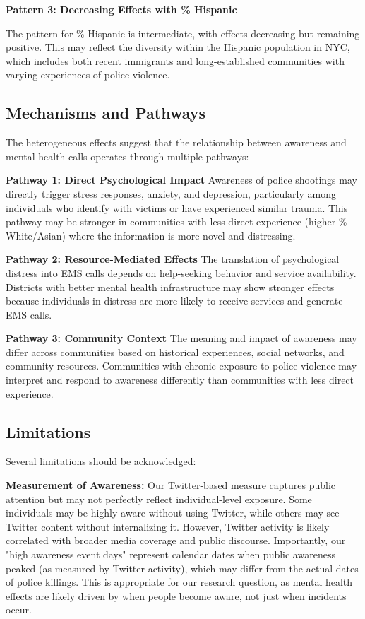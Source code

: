 \documentclass[11pt,a4paper]{article}
\begin{document}
\textbf{Pattern 3: Decreasing Effects with \% Hispanic}

The pattern for \% Hispanic is intermediate, with effects decreasing but remaining positive. This may reflect the diversity within the Hispanic population in NYC, which includes both recent immigrants and long-established communities with varying experiences of police violence.

\subsection{Mechanisms and Pathways}

The heterogeneous effects suggest that the relationship between awareness and mental health calls operates through multiple pathways:

\textbf{Pathway 1: Direct Psychological Impact}
Awareness of police shootings may directly trigger stress responses, anxiety, and depression, particularly among individuals who identify with victims or have experienced similar trauma. This pathway may be stronger in communities with less direct experience (higher \% White/Asian) where the information is more novel and distressing.

\textbf{Pathway 2: Resource-Mediated Effects}
The translation of psychological distress into EMS calls depends on help-seeking behavior and service availability. Districts with better mental health infrastructure may show stronger effects because individuals in distress are more likely to receive services and generate EMS calls.

\textbf{Pathway 3: Community Context}
The meaning and impact of awareness may differ across communities based on historical experiences, social networks, and community resources. Communities with chronic exposure to police violence may interpret and respond to awareness differently than communities with less direct experience.

\subsection{Limitations}

Several limitations should be acknowledged:

\textbf{Measurement of Awareness:} Our Twitter-based measure captures public attention but may not perfectly reflect individual-level exposure. Some individuals may be highly aware without using Twitter, while others may see Twitter content without internalizing it. However, Twitter activity is likely correlated with broader media coverage and public discourse. Importantly, our "high awareness event days" represent calendar dates when public awareness peaked (as measured by Twitter activity), which may differ from the actual dates of police killings. This is appropriate for our research question, as mental health effects are likely driven by when people become aware, not just when incidents occur.
\end{document}
